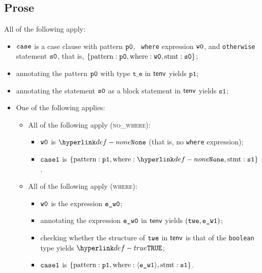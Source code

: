 \documentclass{book}
\newcommand\ProseOrTypeError[0]{\ProseTerminateAs{\TypeErrorConfig}}
\newcommand\vte[0]{\texttt{t\_e}}
\newcommand\vsone[0]{\texttt{s1}}
\newcommand\vpone[0]{\texttt{p1}}
\begin{document}
\subsection{Prose}
All of the following apply:
\begin{itemize}
  \item $\texttt{case}$ is a case clause with pattern $\texttt{p0}$, \optional\ \texttt{where} expression $\texttt{w0}$,
        and \texttt{otherwise} statement $\texttt{s0}$, that is,
        $\{ \text{pattern} : \texttt{p0}, \text{where} : \texttt{w0}, \text{stmt} : \texttt{s0} \}$;
  \item annotating the pattern $\texttt{p0}$ with type $\vte$ in $\textsf{tenv}$ yields $\vpone$\ProseOrTypeError;
  \item annotating the statement $\texttt{s0}$ as a block statement in $\textsf{tenv}$ yields $\vsone$\ProseOrTypeError;
  \item One of the following applies:
  \begin{itemize}
    \item All of the following apply (\textsc{no\_where}):
    \begin{itemize}
      \item $\texttt{w0}$ is $\None$ (that is, no \texttt{where} expression);
      \item $\texttt{case1}$ is $\{ \text{pattern} : \vpone, \text{where} : \None, \text{stmt} : \vsone \}$.
    \end{itemize}

    \item All of the following apply (\textsc{where}):
    \begin{itemize}
      \item $\texttt{w0}$ is the expression $\texttt{e\_w0}$;
      \item annotating the expression $\texttt{e\_w0}$ in $\textsf{tenv}$ yields $(\texttt{twe}, \texttt{e\_w1})$\ProseOrTypeError;
      \item checking whether the structure of $\texttt{twe}$ in $\textsf{tenv}$ is that of the \texttt{boolean} type yields $\True$\ProseOrTypeError;
      \item $\texttt{case1}$ is $\{ \text{pattern} : \vpone, \text{where} : \langle\vewone\rangle, \text{stmt} : \vsone \}$.
    \end{itemize}
  \end{itemize}
\end{itemize}
\end{document}
